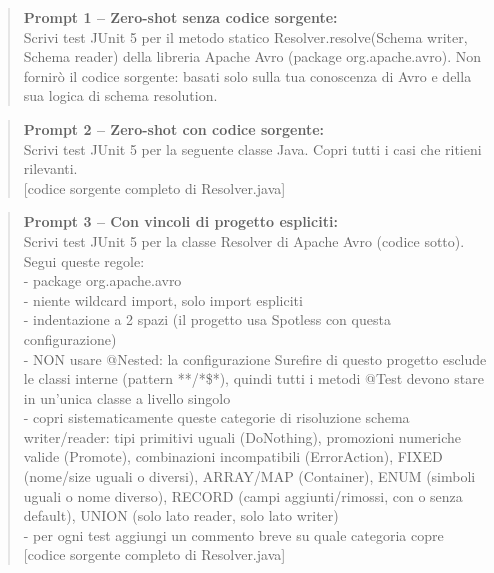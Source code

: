 \begin{table}[h]
\centering
\begin{minipage}{0.95\textwidth}
\begin{quote}
\ttfamily\small
\textbf{Prompt 1 -- Zero-shot senza codice sorgente:}\\[4pt]
Scrivi test JUnit 5 per il metodo statico Resolver.resolve(Schema writer, Schema reader)
della libreria Apache Avro (package org.apache.avro). Non fornirò il codice sorgente:
basati solo sulla tua conoscenza di Avro e della sua logica di schema resolution.
\end{quote}

\begin{quote}
\ttfamily\small
\textbf{Prompt 2 -- Zero-shot con codice sorgente:}\\[4pt]
Scrivi test JUnit 5 per la seguente classe Java. Copri tutti i casi che ritieni rilevanti.\\[4pt]
{[}codice sorgente completo di Resolver.java{]}
\end{quote}

\begin{quote}
\ttfamily\small
\textbf{Prompt 3 -- Con vincoli di progetto espliciti:}\\[4pt]
Scrivi test JUnit 5 per la classe Resolver di Apache Avro (codice sotto).
Segui queste regole:\\
- package org.apache.avro\\
- niente wildcard import, solo import espliciti\\
- indentazione a 2 spazi (il progetto usa Spotless con questa configurazione)\\
- NON usare @Nested: la configurazione Surefire di questo progetto esclude le classi
  interne (pattern **{/}*\$*), quindi tutti i metodi @Test devono stare in
  un'unica classe a livello singolo\\
- copri sistematicamente queste categorie di risoluzione schema writer/reader:
  tipi primitivi uguali (DoNothing), promozioni numeriche valide (Promote),
  combinazioni incompatibili (ErrorAction), FIXED (nome/size uguali o diversi),
  ARRAY/MAP (Container), ENUM (simboli uguali o nome diverso),
  RECORD (campi aggiunti/rimossi, con o senza default),
  UNION (solo lato reader, solo lato writer)\\
- per ogni test aggiungi un commento breve su quale categoria copre\\[4pt]
{[}codice sorgente completo di Resolver.java{]}
\end{quote}
\end{minipage}
\caption{Testo completo dei tre prompt utilizzati per la generazione LLM su \texttt{Resolver}.}
\label{tab:prompt-resolver}
\end{table}
